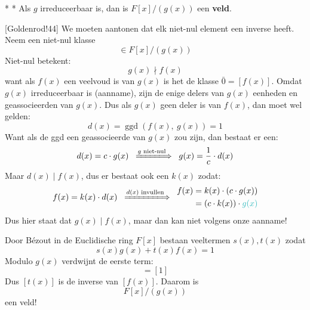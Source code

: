 \begin{nicetheorem}*
    \nextpart[]*
    Als $g$ irreduceerbaar is, dan is $F[x]/(g(x))$ een \textbf{veld}.
\end{nicetheorem}

[Goldenrod!44] We moeten aantonen dat elk niet-nul element een inverse heeft. Neem een niet-nul klasse
\begin{equation*}
    [f(x)] \in F[x]/(g(x))
\end{equation*}
Niet-nul betekent:
\begin{equation*}
    g(x) \nmid f(x)
\end{equation*}
want als $f(x)$ een veelvoud is van $g(x)$ is het de klasse $\bar{0} = [f(x)]$. Omdat $g(x)$ irreduceerbaar is (aanname), zijn de enige delers van $g(x)$ eenheden en geassocieerden van $g(x)$. Dus als $g(x)$ geen deler is van $f(x)$, dan moet wel gelden:
\begin{equation*}
    d(x) = \operatorname{ggd}(f(x),\ g(x)) = 1
\end{equation*}
Want als de ggd een geassocieerde van $g(x)$ zou zijn, dan bestaat er een:
\begin{equation*}
    d(x) = c \cdot g(x) \;\;\xLongrightarrow{g\text{ niet-nul}}\;\; g(x) = \frac{1}{c} \cdot d(x)
\end{equation*}
Maar $d(x) \mid f(x)$, dus er bestaat ook een $k(x)$ zodat:
\begin{equation*}
    f(x) = k(x) \cdot d(x) \;\;\xLongrightarrow{d(x)\text{ invullen}}\;\; \begin{aligned}
        f(x) &= k(x) \cdot (c \cdot g(x)) \\
             &= (c \cdot k(x)) \cdot \textcolor{Aquamarine}{g(x)}
    \end{aligned}
\end{equation*} 
Dus hier staat dat $g(x) \mid f(x)$, maar dan kan niet volgens onze aanname!

Door Bézout in de Euclidische ring $F[x]$ bestaan veeltermen $s(x), t(x)$ zodat
\begin{equation*}
    s(x)g(x) + t(x)f(x) = 1
\end{equation*}
Modulo $g(x)$ verdwijnt de eerste term:
\begin{equation*}
    [t(x)][f(x)] = [1]
\end{equation*}
Dus $[t(x)]$ is de inverse van $[f(x)]$. Daarom is 
\begin{equation*}
    F[x]/(g(x))
\end{equation*}
een veld!


